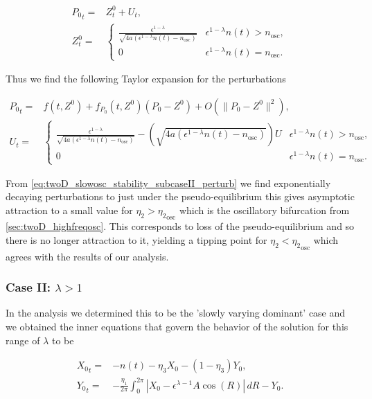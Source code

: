 \begin{equation}
\begin{aligned}
{P_0}_t =& Z^0_t+U_t,\\
Z^0_t=&\begin{cases}
\frac{\epsilon^{1-\lambda}}{\sqrt{4a(\epsilon^{1-\lambda}n(t)-n_{\text{osc}})}} & \epsilon^{1-\lambda}n(t)>n_{\text{osc}},\\
0 & \epsilon^{1-\lambda}n(t)=n_{\text{osc}}.
\end{cases}
\end{aligned}
\end{equation}

Thus we find the following Taylor expansion for the perturbations

\begin{equation}\label{eq:twoD_slowosc_stability_subcaseII_perturb}
\begin{aligned}
{P_0}_t =& f(t,Z^0)+f_{P_0}(t,Z^0)(P_0-Z^0)+O(\lVert P_0-Z^0 \rVert^2),\\
 U_t = & \begin{cases}
\frac{\epsilon^{1-\lambda}}{\sqrt{4a(\epsilon^{1-\lambda}n(t)-n_{\text{osc}})}}-\left(\sqrt{4a(\epsilon^{1-\lambda}n(t)-n_{\text{osc}})}\right) U & \epsilon^{1-\lambda}n(t)>n_{\text{osc}},\\
0 & \epsilon^{1-\lambda}n(t)=n_{\text{osc}}.
\end{cases}
\end{aligned}
\end{equation}

From \eqref{eq:twoD_slowosc_stability_subcaseII_perturb} we find exponentially decaying perturbations to just under the pseudo-equilibrium this gives asymptotic attraction to a small value for $\eta_2>{\eta_2}_{\text{osc}}$ which is the oscillatory bifurcation from \autoref{sec:twoD_highfreqosc}. This corresponds to loss of the pseudo-equilibrium and so there is no longer attraction to it, yielding a tipping point for $\eta_2<{\eta_2}_{\text{osc}}$ which agrees with the results of our analysis.

\subsubsection{Case II: $\lambda>1$}

In the analysis we determined this to be the 'slowly varying dominant' case and we obtained the inner equations that govern the behavior of the solution for this range of $\lambda$ to be

\begin{equation}\label{eq:twoD_slowosc_caseII_full}
\begin{aligned}
{X_0}_t =& - n(t)-\eta_3 X_0 -(1-\eta_3)Y_0,\\
{Y_0}_t =& -\frac{\eta_1}{2\pi}\int_0^{2\pi}|X_0-\epsilon^{\lambda-1} A\cos(R)|\,dR - Y_0.
\end{aligned}
\end{equation}

